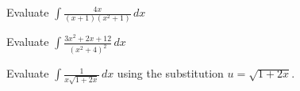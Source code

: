 \documentclass[../mathNotesPreamble]{subfiles}
\begin{document}
  \begin{ex*}
    Evaluate $\displaystyle \int \frac{4x}{(x+1)(x^2+1)}\,dx$
  \end{ex*}
  \pagebreak

  \begin{ex*}
    Evaluate $\displaystyle \int \frac{3x^2+2x+12}{(x^2+4)^2}\,dx$
  \end{ex*}
  \pagebreak

  \begin{ex*}
    Evaluate $\displaystyle \int \frac{1}{x\sqrt{1+2x}}\,dx$ using the substitution $u=\sqrt{1+2x}$.
  \end{ex*}
  \pagebreak
\end{document}
